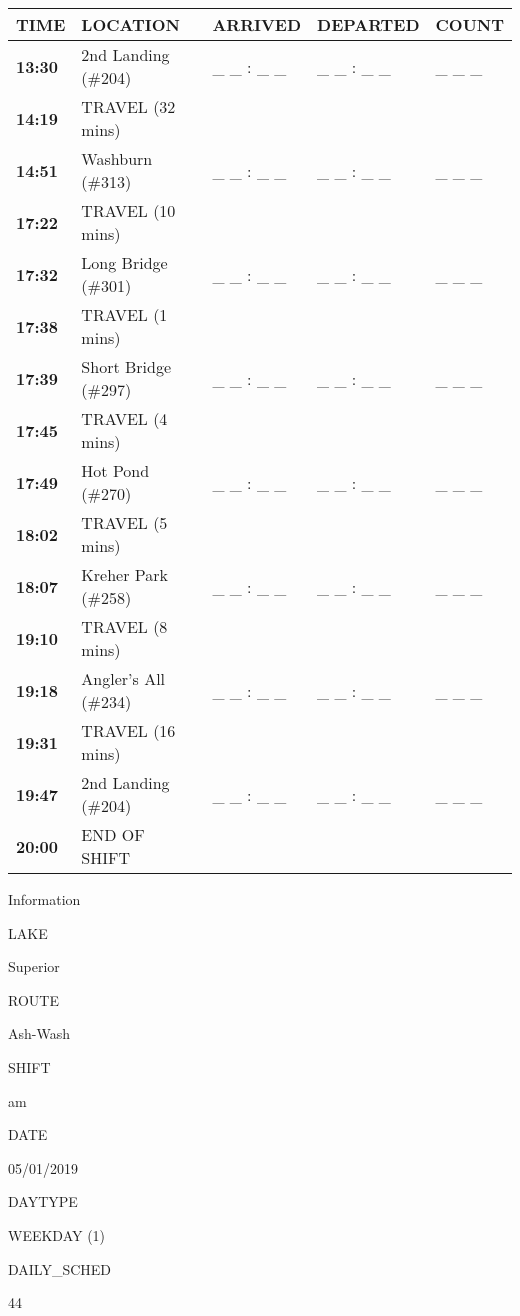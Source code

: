 \documentclass[]{article}
\begin{document}
\begin{tabular}{>{\bfseries}lllll}
\toprule
\textbf{TIME} & \textbf{LOCATION} & \textbf{ARRIVED} & \textbf{DEPARTED} & \textbf{COUNT}\\
\midrule
13:30 & 2nd Landing (\#204) & \_ \_ : \_ \_ & \_ \_ : \_ \_ & \_ \_ \_\\
14:19 & TRAVEL (32 mins) &  &  & \\
14:51 & Washburn (\#313) & \_ \_ : \_ \_ & \_ \_ : \_ \_ & \_ \_ \_\\
17:22 & TRAVEL (10 mins) &  &  & \\
17:32 & Long Bridge (\#301) & \_ \_ : \_ \_ & \_ \_ : \_ \_ & \_ \_ \_\\
17:38 & TRAVEL (1 mins) &  &  & \\
17:39 & Short Bridge (\#297) & \_ \_ : \_ \_ & \_ \_ : \_ \_ & \_ \_ \_\\
17:45 & TRAVEL (4 mins) &  &  & \\
17:49 & Hot Pond (\#270) & \_ \_ : \_ \_ & \_ \_ : \_ \_ & \_ \_ \_\\
18:02 & TRAVEL (5 mins) &  &  & \\
18:07 & Kreher Park (\#258) & \_ \_ : \_ \_ & \_ \_ : \_ \_ & \_ \_ \_\\
19:10 & TRAVEL (8 mins) &  &  & \\
19:18 & Angler's All (\#234) & \_ \_ : \_ \_ & \_ \_ : \_ \_ & \_ \_ \_\\
19:31 & TRAVEL (16 mins) &  &  & \\
19:47 & 2nd Landing (\#204) & \_ \_ : \_ \_ & \_ \_ : \_ \_ & \_ \_ \_\\
20:00 & END OF SHIFT &  &  & \\
\bottomrule
\end{tabular}\newpage

Information

LAKE

Superior

ROUTE

Ash-Wash

SHIFT

am

DATE

05/01/2019

DAYTYPE

WEEKDAY (1)

DAILY\_SCHED

44

\vspace{24pt}
\end{document}
